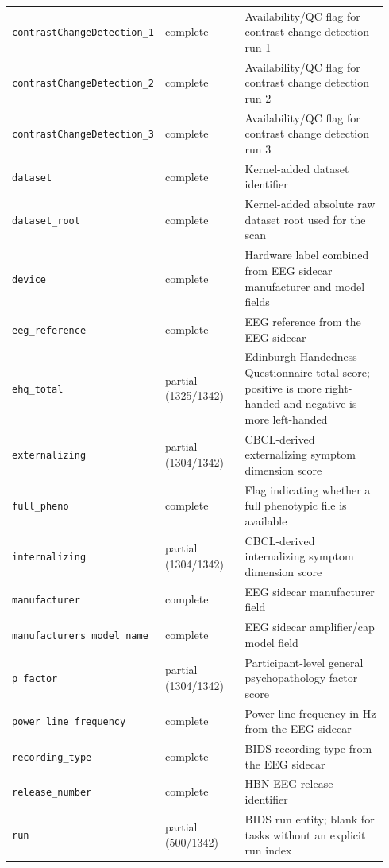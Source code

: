 {\begin{tcolorbox}
\begin{tabular}{@{}p{0.2350\linewidth}p{0.2350\linewidth}p{0.4700\linewidth}@{}}
\texttt{contrastChangeDetection\_\allowbreak{}1} & complete & Availability/QC flag for contrast change detection run 1 \\
\texttt{contrastChangeDetection\_\allowbreak{}2} & complete & Availability/QC flag for contrast change detection run 2 \\
\texttt{contrastChangeDetection\_\allowbreak{}3} & complete & Availability/QC flag for contrast change detection run 3 \\
\texttt{dataset} & complete & Kernel-added dataset identifier \\
\texttt{dataset\_\allowbreak{}root} & complete & Kernel-added absolute raw dataset root used for the scan \\
\texttt{device} & complete & Hardware label combined from EEG sidecar manufacturer and model fields \\
\texttt{eeg\_\allowbreak{}reference} & complete & EEG reference from the EEG sidecar \\
\texttt{ehq\_\allowbreak{}total} & partial (1325/1342) & Edinburgh Handedness Questionnaire total score; positive is more right-handed and negative is more left-handed \\
\texttt{externalizing} & partial (1304/1342) & CBCL-derived externalizing symptom dimension score \\
\texttt{full\_\allowbreak{}pheno} & complete & Flag indicating whether a full phenotypic file is available \\
\texttt{internalizing} & partial (1304/1342) & CBCL-derived internalizing symptom dimension score \\
\texttt{manufacturer} & complete & EEG sidecar manufacturer field \\
\texttt{manufacturers\_\allowbreak{}model\_\allowbreak{}name} & complete & EEG sidecar amplifier/cap model field \\
\texttt{p\_\allowbreak{}factor} & partial (1304/1342) & Participant-level general psychopathology factor score \\
\texttt{power\_\allowbreak{}line\_\allowbreak{}frequency} & complete & Power-line frequency in Hz from the EEG sidecar \\
\texttt{recording\_\allowbreak{}type} & complete & BIDS recording type from the EEG sidecar \\
\texttt{release\_\allowbreak{}number} & complete & HBN EEG release identifier \\
\texttt{run} & partial (500/1342) & BIDS run entity; blank for tasks without an explicit run index \\

\end{tabular}
\end{tcolorbox}}
